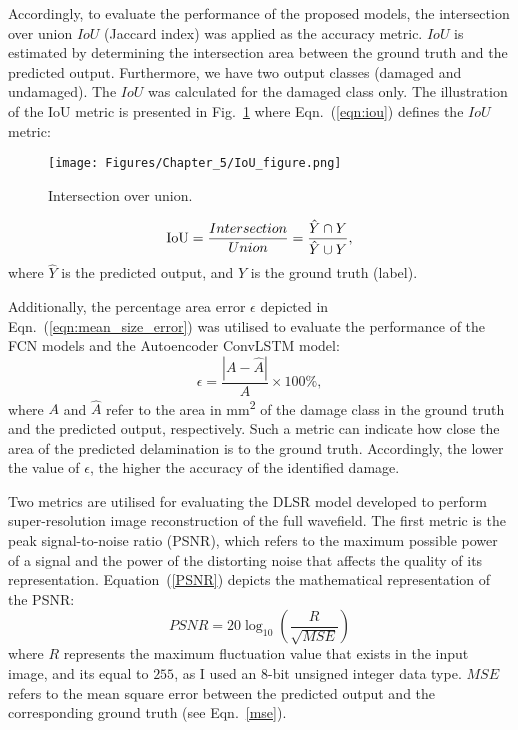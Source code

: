 Accordingly, to evaluate the performance of the proposed models, the intersection over union \(IoU\) (Jaccard index) was applied as the accuracy metric.
\(IoU\) is estimated by determining the intersection area between the ground truth and the predicted output.
Furthermore, we have two output classes (damaged and undamaged). 
The \(IoU\) was calculated for the damaged class only.
The illustration of the IoU metric is presented in Fig.~\ref{fig:iou} where Eqn.~(\ref{eqn:iou}) defines the \(IoU\) metric:
\begin{figure} [h!]
	\begin{center}
		\texttt{[image: Figures/Chapter\_5/IoU\_figure.png]}
	\end{center}
	\caption{Intersection over union.} 
	\label{fig:iou}
\end{figure}
\begin{equation}
	\textup{IoU}=\frac{Intersection}{Union}=\frac{\hat{Y} \cap Y}{\hat{Y} \cup Y},
	\label{eqn:iou}
\end{equation}
where \(\hat{Y}\) is the predicted output, and \(Y\) is the ground truth (label).

Additionally, the percentage area error $\epsilon$ depicted in Eqn.~(\ref{eqn:mean_size_error}) was utilised to evaluate the performance of the FCN models and the Autoencoder ConvLSTM model:
\begin{equation}
	\epsilon=\frac{|A-\hat{A}|}{A} \times 100\%,
	\label{eqn:mean_size_error}
\end{equation}
where \(A\) and \(\hat{A}\) refer to the area in mm\textsuperscript{2} of the damage class in the ground truth and the predicted output, respectively.
Such a metric can indicate how close the area of the predicted delamination is to the ground truth.
Accordingly, the lower the value of $\epsilon$, the higher the accuracy of the identified damage. 

Two metrics are utilised for evaluating the DLSR model developed to perform super-resolution image reconstruction of the full wavefield.
The first metric is the peak signal-to-noise ratio (PSNR), which refers to the maximum possible power of a signal and the power of the distorting noise that affects the quality of its representation.
Equation~(\ref{PSNR}) depicts the mathematical representation of the PSNR:
\begin{equation}
	PSNR=20\log_{10}\left(\frac{R}{\sqrt{MSE}}\right)
	\label{PSNR}
\end{equation}
where \(R\) represents the maximum fluctuation value that exists in the input image, and its equal to \(255\), as I used an 8-bit unsigned integer data type.
\(MSE\) refers to the mean square error between the predicted output and the corresponding ground truth (see Eqn.~\ref{mse}).

